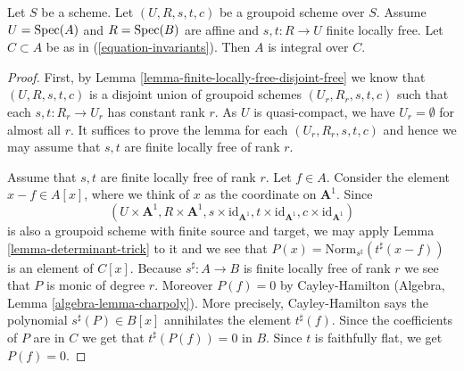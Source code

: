 \begin{lemma}
\label{lemma-integral-over-invariants}
Let $S$ be a scheme. Let $(U, R, s, t, c)$ be a groupoid scheme over $S$.
Assume $U = \mathop{\mathrm{Spec}}(A)$ and $R = \mathop{\mathrm{Spec}}(B)$ are affine and
$s, t : R \to U$ finite locally free.
Let $C \subset A$ be as in (\ref{equation-invariants}).
Then $A$ is integral over $C$.
\end{lemma}

\begin{proof}
First, by Lemma \ref{lemma-finite-locally-free-disjoint-free}
we know that $(U, R, s, t, c)$ is a disjoint union
of groupoid schemes $(U_r, R_r, s, t, c)$ such that each $s, t : R_r \to U_r$
has constant rank $r$. As $U$ is quasi-compact, we have $U_r = \emptyset$ for
almost all $r$. It suffices to prove the lemma for each $(U_r, R_r, s, t, c)$
and hence we may assume that $s, t$ are finite locally free of rank $r$.

\medskip\noindent
Assume that $s, t$ are finite locally free of rank $r$.
Let $f \in A$. Consider the element $x - f \in A[x]$, where we think
of $x$ as the coordinate on $\mathbf{A}^1$.
Since
$$
(U \times \mathbf{A}^1, R \times \mathbf{A}^1,
s \times \text{id}_{\mathbf{A}^1},
t \times \text{id}_{\mathbf{A}^1},
c \times \text{id}_{\mathbf{A}^1})
$$
is also a groupoid scheme with finite source and target, we may apply
Lemma \ref{lemma-determinant-trick} to it and we see that
$P(x) = \text{Norm}_{s^\sharp}(t^\sharp(x - f))$
is an element of $C[x]$. Because $s^\sharp : A \to B$ is finite locally
free of rank $r$ we see that $P$ is monic of degree $r$.
Moreover $P(f) = 0$ by Cayley-Hamilton
(Algebra, Lemma \ref{algebra-lemma-charpoly}).
More precisely, Cayley-Hamilton says the polynomial
$s^\sharp(P) \in B[x]$ annihilates the element $t^\sharp(f)$.
Since the coefficients of $P$ are in $C$ we get that
$t^\sharp(P(f)) = 0$ in $B$. Since $t$ is faithfully flat,
we get $P(f) = 0$.
\end{proof}

